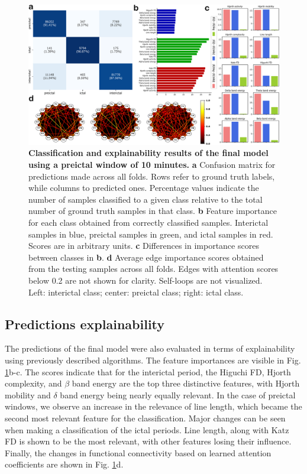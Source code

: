 \documentclass[a4paper,fleqn]{cas-sc}
\begin{document}
\begin{figure}
    \centering
    \includegraphics[width=\linewidth]{figures/Fig3.pdf}
    \caption{\textbf{Classification and explainability results of the final model using a preictal window of 10 minutes.} \textbf{a} Confusion matrix for predictions made across all folds. Rows refer to ground truth labels, while columns to predicted ones. Percentage values indicate the number of samples classified to a given class relative to the total number of ground truth samples in that class. \textbf{b} Feature importance for each class obtained from correctly classified samples. Interictal samples in blue, preictal samples in green, and ictal samples in red. Scores are in arbitrary units. \textbf{c} Differences in importance scores between classes in \textbf{b}. \textbf{d} Average edge importance scores obtained from the testing samples across all folds. Edges with attention scores below 0.2 are not shown for clarity. Self-loops are not visualized. Left: interictal class; center: preictal class; right: ictal class.}
    \label{fig:results-final}
\end{figure}

\subsection{Predictions explainability}
The predictions of the final model were also evaluated in terms of explainability using previously described algorithms. The feature importances are visible in Fig. \ref{fig:results-final}b-c. The scores indicate that for the interictal period, the Higuchi FD, Hjorth complexity, and $\beta$ band energy are the top three distinctive features, with Hjorth mobility and $\delta$ band energy being nearly equally relevant. In the case of preictal windows, we observe an increase in the relevance of line length, which became the second most relevant feature for the classification. Major changes can be seen when making a classification of the ictal periods. Line length, along with Katz FD is shown to be the most relevant, with other features losing their influence. Finally, the changes in functional connectivity based on learned attention coefficients are shown in Fig. \ref{fig:results-final}d. 
\end{document}

